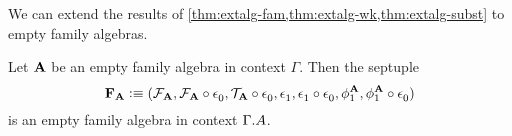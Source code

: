 We can extend the results of 
\autoref{thm:extalg-fam,thm:extalg-wk,thm:extalg-subst} to empty family algebras.

\begin{thm}\label{thm:cftalg-fam}
Let $\mathbf{A}$ be an empty family algebra
in context $\Gamma$. Then the septuple
\begin{equation*}
\cftfamalg{\cftalg{A}}
  \defeq
  ( \cftalgf{\cftalg{A}},
    \jcomp{}{\cftctxext}{\cftalgf{\cftalg{A}}},
    \jcomp{}{\cftctxext}{\cftalgt{\cftalg{A}}},
    \cftfamext,
    \jcomp{}{\cftctxext}{\cftfamext},
    \cftempf{\cftalg{A}},
    \jcomp{}{\cftctxext}{\cftempf{\cftalg{A}}})
\end{equation*}
is an empty family algebra in context $\ctxext{\Gamma}{\cftalgc{\cftalg{A}}}$. 
\end{thm}

